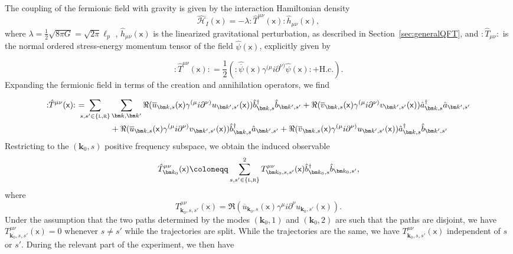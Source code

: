 \documentclass[letterpaper,12pt,titlepage,oneside,final]{book}
\newcommand{\normord}[1]{\vcentcolon\mathrel{#1}\vcentcolon}
\providecommand{\vcentcolon}{\mathrel{\mathop{:}}}
\newcommand{\mf}{\mathsf}%
\newcommand{\tc}[1]{\textsc{#1}}
\begin{document}
The coupling of the fermionic field with gravity is given by the interaction Hamiltonian density
\begin{equation}
    \hat{\mathcal{H}}_I(\mf x) = - \lambda \normord{\hat{T}^{\mu\nu}(\mf x)} \hat{h}_{\mu\nu}(\mf x),
\end{equation}
where $\lambda = \tfrac{1}{2}\sqrt{8 \pi G} = \sqrt{2\pi}\ell_p$ , $\hat{h}_{\mu\nu}(\mf x)$ is the linearized gravitational perturbation, as described in Section~\ref{sec:generalQFT}, and $\normord{\hat{T}_{\mu\nu}}$ is the normal ordered stress-energy momentum tensor of the field $\hat{\psi}(\mf x)$, explicitly given by

\begin{equation}\label{eq:TmunuFermion}
    \normord{\hat{T}^{\mu\nu}(\mf x)} = \frac{1}{2}\left(\normord{\hat{\overline{\psi}}(\mf x) \gamma^{(\mu}i\partial^{\nu)}\hat{\psi}(\mf x)} + \text{H.c.}\right).
\end{equation}
Expanding the fermionic field in terms of the creation and annihilation operators, we find

\begin{align}
    \normord{\hat{T}^{\mu\nu}(\mf x)} \,\,=\!\!\!\!\! \sum_{s,s'\in\{\tc{l},\tc{r}\}}&\sum_{\bm k, \bm k'} \Re(\overline{u}_{\bm k,s}(\mf x)\gamma^{(\mu} i \partial^{\nu)} u_{\bm k',s'}(\mf x)) \hat{b}_{\bm k,s}^\dagger \hat{b}_{\bm k',s'} + \Re(\overline{v}_{\bm k,s}(\mf x)\gamma^{(\mu} i \partial^{\nu)} v_{\bm k',s'}(\mf x)) \hat{a}^\dagger_{\bm k,s} \hat{a}_{\bm k',s'}\nonumber\\
    &+\Re(\overline{u}_{\bm k,s}(\mf x)\gamma^{(\mu} i \partial^{\nu)} v_{\bm k',s'}(\mf x)) \hat{b}_{\bm k,s}^\dagger \hat{a}_{\bm k',s'} + \Re(\overline{v}_{\bm k,s}(\mf x)\gamma^{(\mu} i \partial^{\nu)} u_{\bm k',s'}(\mf x)) \hat{a}^\dagger_{\bm k,s} \hat{b}_{\bm k',s'}
\end{align}
Restricting to the $(\bm k_0,s)$ positive frequency subspace, we obtain the induced observable
\begin{equation}
    \hat{T}_{\bm k_0}^{\mu\nu}(\mf x) \coloneqq \sum_{s,s'\in\{\tc{l},\tc{r}\}}^2 T^{\mu\nu}_{\bm k_0,s,s'}(\mf x)\hat{b}_{\bm k_0,s}^\dagger \hat{b}_{\bm k_0,s'},
\end{equation}
where 
\begin{equation}
    T^{\mu\nu}_{\bm k_0,s,s'}(\mf x) = \Re(\overline{u}_{\bm k_0,s}(\mf x)\gamma^\mu i \partial^\nu u_{\bm k_0,s'}(\mf x)).
\end{equation}
Under the assumption that the two paths determined by the modes $(\bm k_0,1)$ and $(\bm k_0,2)$ are such that the paths are disjoint, we have $T^{\mu\nu}_{\bm k_0,s,s'}(\mf x) = 0$ whenever $s\neq s'$ while the trajectories are split. While the trajectories are the same, we have $T^{\mu\nu}_{\bm k_0,s,s'}(\mf x)$ independent of $s$ or $s'$. During the relevant part of the experiment, we then have
\end{document}
